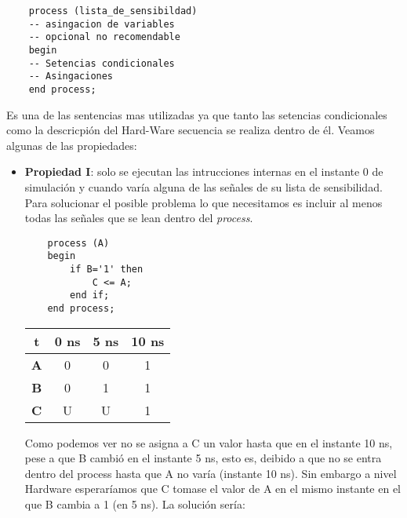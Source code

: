 \begin{lstlisting}
    process (lista_de_sensibildad)
    -- asingacion de variables
    -- opcional no recomendable
    begin 
    -- Setencias condicionales
    -- Asingaciones 
    end process; 
\end{lstlisting}
Es una de las sentencias mas utilizadas ya que tanto las setencias condicionales como la descricpión del Hard-Ware secuencia se realiza dentro de él. Veamos algunas de las propiedades: 

\begin{itemize}
    \item \textbf{Propiedad I}: solo se ejecutan las intrucciones internas en el instante 0 de simulación y cuando varía alguna de las señales de su lista de sensibilidad. Para solucionar el posible problema lo que necesitamos es incluir al menos todas las señales que se lean dentro del \textit{process}.
    
    \vspace*{1em}
    
\begin{minipage}{0.47\linewidth} \centering
    \begin{lstlisting}
    process (A)
    begin
        if B='1' then
            C <= A;
        end if;
    end process;
    \end{lstlisting}
\end{minipage}\hfill
\begin{minipage}{0.47\linewidth} \centering
    \begin{tabular}{|c|c|c|c|}
    \hline
    \textbf{t} & \textbf{0 ns} & \textbf{5 ns} & \textbf{10 ns} \\
    \hline
    \textbf{A} & 0 & 0 & 1 \\
    \hline
    \textbf{B} & 0 & 1 & 1 \\
    \hline
    \textbf{C} & U & U & 1 \\
    \hline
    \end{tabular}
\end{minipage}
    
\vspace*{-0.5em}
    
    Como podemos ver no se asigna a C un valor hasta que en el instante 10 ns, pese a que B  cambió en el instante 5 ns, esto es, deibido a que no se entra dentro del process hasta que A no varía (instante 10 ns). Sin embargo a nivel Hardware esperaríamos que C tomase el valor de A en el mismo instante en el que B cambia a 1 (en 5 ns). La solución sería: 
    

\end{itemize}
